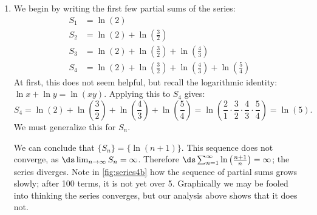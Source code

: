 {\begin{enumerate}
\item	We begin by writing the first few partial sums of the series:
\begin{align*}
S_1 &= \ln\left(2\right) \\
S_2 &= \ln\left(2\right)+\ln\left(\frac32\right) \\
S_3 &= \ln\left(2\right)+\ln\left(\frac32\right)+\ln\left(\frac43\right) \\
S_4 &= \ln\left(2\right)+\ln\left(\frac32\right)+\ln\left(\frac43\right)
+\ln\left(\frac54\right) 
\end{align*}
At first, this does not seem helpful, but recall the logarithmic identity: $\ln x+\ln y = \ln (xy).$ Applying this to $S_4$ gives:
\[
S_4 = \ln\left(2\right)+\ln\left(\frac32\right)+\ln\left(\frac43\right)
+\ln\left(\frac54\right)
=\ln\left(\frac21\cdot\frac32\cdot\frac43\cdot\frac54\right)
=\ln\left(5\right).
\]
We must generalize this for $S_n$.\\
\flushinnerequ{%
\[
S_n=\ln\left(2\right)+\ln\left(\frac32\right)+\dots +\ln \left(\frac{n+1}{n}\right)
=\ln\left(\frac21\cdot\frac32 \dots  \frac{n}{n-1}\cdot \frac{n+1}{n}\right)
=\ln(n+1)
\]}


We can conclude that $\{S_n\} = \big\{\ln (n+1)\big\}$. This sequence  does not converge, as $\ds \lim_{n\to\infty}S_n=\infty$. Therefore  $\ds\sum_{n=1}^\infty  \ln\left(\frac{n+1}{n}\right)=\infty$; the series diverges. Note in \autoref{fig:series4b} how the sequence of partial sums grows slowly; after 100 terms, it is not yet over 5. Graphically we may be fooled into thinking the series converges, but our analysis above shows that it does not.\eoehere
\end{enumerate}}

